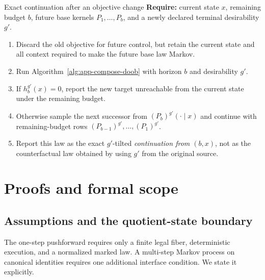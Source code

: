\begin{composeappendixalgorithm}{Exact continuation after an objective change}
\label{alg:app-compose-dynamic}
\textbf{Require:} current state $x$, remaining budget $b$, future base kernels
$P_1,\ldots,P_b$, and a newly declared terminal desirability $g'$.
\begin{enumerate}[
  leftmargin=2.45em,
  label=\arabic*:,
  topsep=0.25em,
  itemsep=0.12em,
  parsep=0pt
]
  \item Discard the old objective for future control, but retain the current
  state and all context required to make the future base law Markov.
  \item Run Algorithm~\ref{alg:app-compose-doob} with horizon $b$ and
  desirability $g'$.
  \item If $h_b^{g'}(x)=0$, report the new target unreachable from the current
  state under the remaining budget.
  \item Otherwise sample the next successor from
  $(P_b)^{g'}(\cdot\mid x)$ and continue with remaining-budget rows
  $(P_{b-1})^{g'},\ldots,(P_1)^{g'}$.
  \item Report this law as the exact $g'$-tilted \emph{continuation from
  $(b,x)$}, not as the counterfactual law obtained by using $g'$ from the
  original source.
\end{enumerate}
\end{composeappendixalgorithm}

\section{Proofs and formal scope}
\label{sec:app-compose-proofs}

\subsection{Assumptions and the quotient-state boundary}
\label{sec:app-compose-assumptions}

The one-step pushforward requires only a finite legal fiber, deterministic
execution, and a normalized marked law.  A multi-step Markov process on
canonical identities requires one additional interface condition.  We state
it explicitly.


